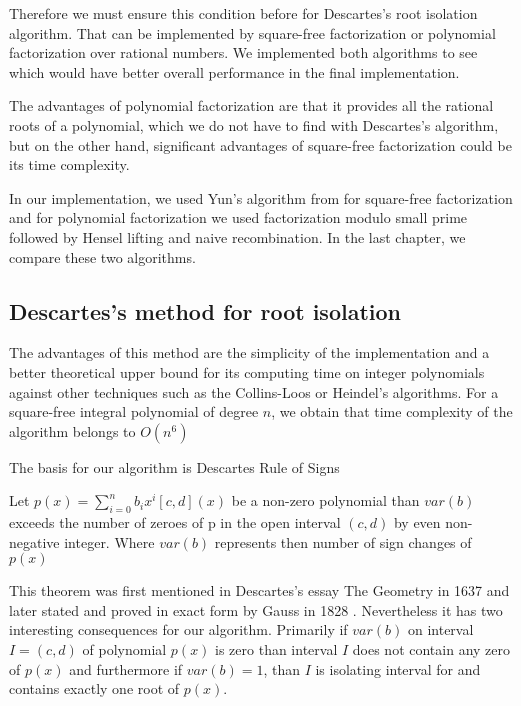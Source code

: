 \documentclass[
  digital, %
  twoside, %
  table,   %
  nolof,     %
  nolot,     %
]{fithesis3}
\begin{document}
 Therefore we must ensure this condition before for Descartes's root isolation algorithm. That can be implemented by square-free factorization or polynomial factorization over rational numbers. We implemented both algorithms to see which would have better overall performance in the final implementation.

 The advantages of polynomial factorization are that it provides all the rational roots of a polynomial, which we do not have to find with Descartes's algorithm, but on the other hand, significant advantages of square-free factorization could be its time complexity. 
 
 In our implementation, we used Yun's algorithm from  for square-free factorization and for polynomial factorization we used factorization modulo small prime followed by Hensel lifting and naive recombination. In the last chapter, we compare these two algorithms.
 
\subsection{Descartes's method for root isolation}
The advantages of this method are the simplicity of the implementation and a better theoretical upper bound for its computing time on integer polynomials against other techniques such as the Collins-Loos or Heindel's algorithms. 
 For a square-free integral polynomial of degree $n$, we obtain that time complexity of the algorithm belongs to  $O(n^6)$  \parencite{Collins:1976}
 
The basis for our algorithm is Descartes Rule of Signs
\begin{theorem}
  Let $p(x) = \sum_{i=0}^n b_ix^i [c, d](x)$ be a non-zero polynomial than $var(b)$ exceeds the number of zeroes of p in the open interval $(c, d)$ by even non-negative integer.\parencite{ganzha2005computer} Where $var(b)$ represents then number of sign changes of $p(x)$
  \end{theorem}
  
This theorem was first mentioned in Descartes's essay The Geometry in 1637 \cite{descartes2007geometry} and later stated and proved in exact form by Gauss in 1828 \cite{gauss1828}. Nevertheless it has two interesting consequences for our algorithm. Primarily if $var(b)$ on interval $ I = (c, d)$ of polynomial $p(x)$ is zero than interval $I$ does not contain any zero of  $p(x)$ and furthermore if $var(b) = 1 $, than $I$ is isolating interval for and contains exactly one root of $p(x)$.
\end{document}
